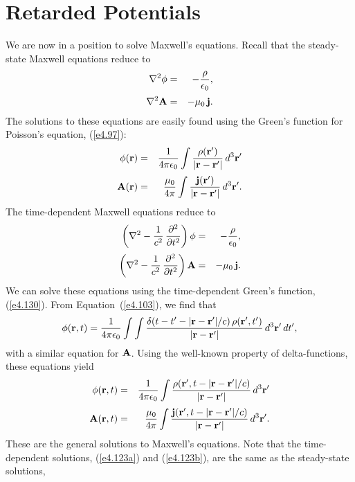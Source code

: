 \section{Retarded Potentials}\label{s4.9}
We are now in a position to solve Maxwell's equations. Recall that the
steady-state Maxwell
equations reduce to
\begin{eqnarray}
\nabla^2 \phi &=& - \frac{\rho}{\epsilon_0},\\[0.5ex]
\nabla^2 {\bf A} &=& - \mu_0 \,{\bf j}.
\end{eqnarray}
The solutions to these equations are  easily found using the Green's function for Poisson's
equation, (\ref{e4.97}):
\begin{eqnarray}\label{e4.120a}
\phi({\bf r}) &=& \frac{1}{4\pi\epsilon_0} \int \frac{\rho({\bf r'})}{|{\bf r} - {\bf r}'|}
\,d^3{\bf r'}\\[0.5ex]
{\bf A}({\bf r}) &=& \frac{\mu_0}{4\pi } \int \frac{{\bf j}({\bf r'})}{|{\bf r} - {\bf r}'|}
\,d^3{\bf r'}.\label{e4.120b}
\end{eqnarray}
The time-dependent Maxwell equations reduce to
\begin{eqnarray}
\left(\nabla^2-\frac{1}{c^2}\,\frac{\partial^2}{\partial t^2}\right) \phi &=& - \frac{\rho}{\epsilon_0},\\[0.5ex]
\left(\nabla^2-\frac{1}{c^2}\,\frac{\partial^2}{\partial t^2}\right)  {\bf A} &=& - \mu_0 \,{\bf j}.
\end{eqnarray}
We can solve these equations using the time-dependent Green's function, (\ref{e4.130}). From Equation~(\ref{e4.103}),
we find that
\begin{equation}
\phi({\bf r}, t) =\frac{1}{4\pi\epsilon_0}  \int\int\frac{ \delta (t-t'- |{\bf r}- {\bf r}'|/c)
\, \rho({\bf r'}, t')}{|{\bf r} - {\bf r}'|}\,d^3{\bf r}'\,dt',
\end{equation}
with a similar equation for ${\bf A}$. Using the well-known property of delta-functions,
these equations yield
\begin{eqnarray}\label{e4.123a}
\phi({\bf r},t) &=& \frac{1}{4\pi\epsilon_0} \int \frac{\rho({\bf r'}, t- |{\bf r}
-{\bf r '}|/c)}{|{\bf r} - {\bf r}'|}
\,d^3{\bf r'}\\[0.5ex]
{\bf A}({\bf r}, t) &=& \frac{\mu_0}{4\pi } \int \frac{{\bf j}({\bf r'},t- |{\bf r}
-{\bf r '}|/c
)}{|{\bf r} - {\bf r}'|}
\,d^3{\bf r'}.\label{e4.123b}
\end{eqnarray}
These  are  the general solutions to Maxwell's equations. Note that the time-dependent solutions,
(\ref{e4.123a}) and (\ref{e4.123b}), are the same as the steady-state solutions,
